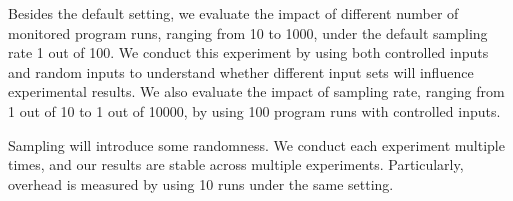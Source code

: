 Besides the default setting,
we evaluate the impact of different number of monitored program runs, 
ranging from 10 to 1000, under the default sampling rate 1 out of 100.
We conduct this experiment by using both controlled inputs and random inputs 
to understand whether different input sets will influence experimental results.
We also evaluate the impact of sampling rate, ranging from 1 out of 10 to 1 out of 10000, 
by using 100 program runs with controlled inputs.  

Sampling will introduce some randomness. 
We conduct each experiment multiple times, 
and our results are stable across multiple experiments. 
Particularly, overhead is measured by using 10 runs under the same setting. 




















%
%





